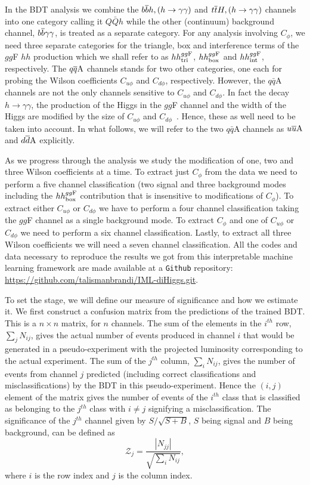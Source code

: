 In the BDT analysis we combine the $b\overline bh, (h\to\gamma\gamma)$ and $t\overline{t}H, (h\to\gamma\gamma)$ channels into one category calling it $Q\bar Q h$ while the other (continuum) background channel, $b\overline b\gamma\gamma$, is treated as a separate category. For any analysis involving $C_\phi$, we need three separate categories for the triangle, box and interference terms of the $gg$F $hh$ production which we shall refer to as $hh^{gg\rm F}_{\rm tri}$, $hh^{gg\rm F}_{\rm box}$ and $hh^{gg\rm F}_{\rm int}$, respectively. The $q\overline q \rm A$ channels stands for two other categories, one each for probing the Wilson coefficients $C_{u\phi}$ and $C_{d\phi}$, respectively. However, the $q\bar q$A channels are not the only channels sensitive to $C_{u\phi}$ and $C_{d\phi}$. In fact the decay $h\to\gamma\gamma$, the production of the Higgs in the $gg$F channel and the width of the Higgs are modified by the size of $C_{u\phi}$ and $C_{d\phi}$~\cite{Alasfar:2019pmn}. Hence, these as well need to be taken into account. In what follows, we will refer to the two $q\bar q$A channels as $u\overline u \rm A$ and $d\overline d \rm A$ explicitly.

As we progress through the analysis we study the modification of one, two and three Wilson coefficients at a time. To extract just $C_\phi$ from the data we need to perform a five channel classification (two signal and three background modes including the $hh^{gg\rm F}_{\rm box}$ contribution that is insensitive to modifications of $C_\phi$). To extract either $C_{u\phi}$ or $C_{d\phi}$ we have to perform a four channel classification taking the $gg$F channel as a single background mode.  To extract $C_\phi$ and one of $C_{u\phi}$ or $C_{d\phi}$ we need to perform a six channel classification. Lastly, to extract all three Wilson coefficients we will need a seven channel classification. All the codes and data necessary to reproduce the results we got from this interpretable machine learning framework are made available at a \texttt{Github} repository: \href{https://github.com/talismanbrandi/IML-diHiggs.git}{https://github.com/talismanbrandi/IML-diHiggs.git}.

To set the stage, we will define our measure of significance and how we estimate it. We first construct a confusion matrix from the predictions of the trained BDT. This is a $n\times n$ matrix, for $n$ channels. The sum of the elements in the $i^{th}$ row, $\sum_j N_{ij}$, gives the actual number of events produced in channel $i$ that would be generated in a pseudo-experiment with the projected luminosity corresponding to the actual experiment. The sum of the $j^{th}$ column, $\sum_i N_{ij}$, gives the number of events from channel $j$ predicted (including correct classifications and misclassifications) by the BDT in this pseudo-experiment. Hence the $(i,j)$ element of the matrix gives the number of events of the $i^{th}$ class that is classified as belonging to the $j^{th}$ class with $i\ne j$ signifying a misclassification. The significance of the $j^{th}$ channel given by $S/\sqrt{S + B}$, $S$ being signal and $B$ being background, can be defined as
\begin{equation}
	\mathcal{Z}_j=\frac{|N_{jj}|}{\sqrt{\sum_i N_{ij}}},
\end{equation}
where $i$ is the row index and $j$ is the column index. 

